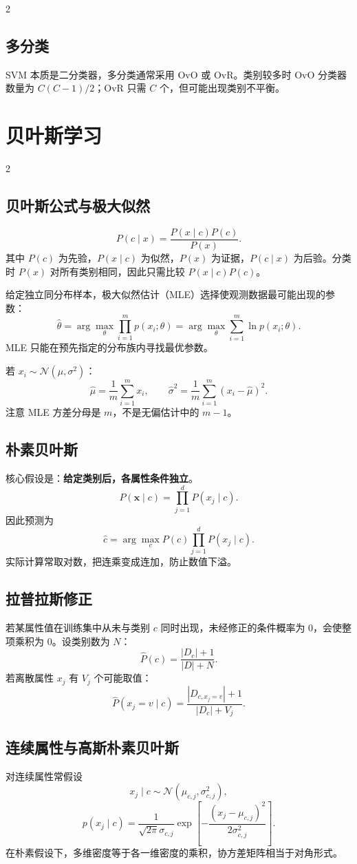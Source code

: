 \documentclass[9pt,a4paper,UTF8]{ctexart}
\begin{document}
\begin{multicols}{2}
\subsection{多分类}
SVM 本质是二分类器，多分类通常采用 OvO 或 OvR。类别较多时 OvO 分类器数量为 $C(C-1)/2$；OvR 只需 $C$ 个，但可能出现类别不平衡。
\end{multicols}

\section{贝叶斯学习}
\begin{multicols}{2}
\subsection{贝叶斯公式与极大似然}
\[
P(c\mid x)=\frac{P(x\mid c)P(c)}{P(x)}.
\]
其中 $P(c)$ 为先验，$P(x\mid c)$ 为似然，$P(x)$ 为证据，$P(c\mid x)$ 为后验。分类时 $P(x)$ 对所有类别相同，因此只需比较 $P(x\mid c)P(c)$。

给定独立同分布样本，极大似然估计（MLE）选择使观测数据最可能出现的参数：
\[
\hat\theta=\arg\max_\theta\prod_{i=1}^{m}p(x_i;\theta)
=\arg\max_\theta\sum_{i=1}^{m}\ln p(x_i;\theta).
\]
MLE 只能在预先指定的分布族内寻找最优参数。

若 $x_i\sim\mathcal N(\mu,\sigma^2)$：
\[
\hat\mu=\frac1m\sum_{i=1}^{m}x_i,\qquad
\hat\sigma^2=\frac1m\sum_{i=1}^{m}(x_i-\hat\mu)^2.
\]
注意 MLE 方差分母是 $m$，不是无偏估计中的 $m-1$。

\subsection{朴素贝叶斯}
核心假设是：\textbf{给定类别后，各属性条件独立}。
\[
P(\bm x\mid c)=\prod_{j=1}^{d}P(x_j\mid c).
\]
因此预测为
\[
\hat c=\arg\max_c P(c)\prod_{j=1}^{d}P(x_j\mid c).
\]
实际计算常取对数，把连乘变成连加，防止数值下溢。

\subsection{拉普拉斯修正}
若某属性值在训练集中从未与类别 $c$ 同时出现，未经修正的条件概率为 0，会使整项乘积为 0。设类别数为 $N$：
\[
\hat P(c)=\frac{|D_c|+1}{|D|+N}.
\]
若离散属性 $x_j$ 有 $V_j$ 个可能取值：
\[
\hat P(x_j=v\mid c)=\frac{|D_{c,x_j=v}|+1}{|D_c|+V_j}.
\]

\subsection{连续属性与高斯朴素贝叶斯}
对连续属性常假设
\[
x_j\mid c\sim\mathcal N(\mu_{c,j},\sigma_{c,j}^2),
\]
\[
p(x_j\mid c)=\frac{1}{\sqrt{2\pi}\sigma_{c,j}}
\exp\left[-\frac{(x_j-\mu_{c,j})^2}{2\sigma_{c,j}^2}\right].
\]
在朴素假设下，多维密度等于各一维密度的乘积，协方差矩阵相当于对角形式。


\end{multicols}
\end{document}
